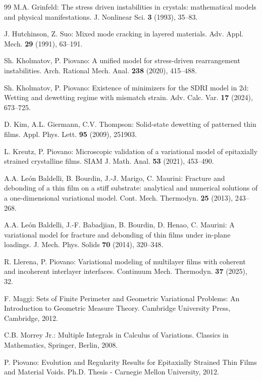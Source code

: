 \documentclass[reqno]{amsart}
\numberwithin{equation}{section}
\theoremstyle{plain}
\theoremstyle{definition}
\begin{document}
\begin{thebibliography}{99}
 M.A. Grinfeld:  The stress driven instabilities in crystals: mathematical models and physical manifestations.  J. Nonlinear Sci. \textbf{3} (1993), 35--83. 


 J. Hutchinson, Z. Suo:  Mixed mode cracking in layered materials.  Adv. Appl. Mech. {\bf 29} (1991), 63--191.

 Sh. Kholmatov, P. Piovano: A unified model for stress-driven rearrangement instabilities. Arch. Rational Mech. Anal. {\bf 238} (2020), 415--488. 


 Sh. Kholmatov, P. Piovano:  Existence of minimizers for the SDRI model in 2d: Wetting and dewetting regime with mismatch strain. Adv. Calc. Var. {\bf17} (2024), 673--725.

 D. Kim, A.L. Giermann,
C.V. Thompson: Solid-state dewetting of patterned thin films. Appl. Phys. Lett. {\bf 95} (2009), 251903.

 L. Kreutz,  P. Piovano: Microscopic validation of a variational model of epitaxially strained crystalline films. SIAM J. Math. Anal. \textbf{53} (2021), 453--490. 

  A.A. Le\'on Baldelli, B. Bourdin,  J.-J. Marigo, C. Maurini:  Fracture and debonding of a thin film on a stiff substrate: analytical and  numerical solutions of a one-dimensional variational model.  Cont. Mech. Thermodyn. \textbf{25} (2013), 243--268.

  A.A. Le\'on Baldelli, J.-F. Babadjian, B. Bourdin, D. Henao, C. Maurini: A variational model for fracture and debonding of thin  films under in-plane loadings. J. Mech. Phys. Solids \textbf{70} (2014), 320--348. 

 R. Llerena,  P. Piovano:
Variational modeling of multilayer films with coherent and incoherent interlayer interfaces. Continuum Mech. Thermodyn. {\bf 37} (2025), 32.



 F. Maggi: Sets of Finite Perimeter and Geometric Variational Problems: An Introduction to Geometric Measure Theory.  Cambridge University Press, Cambridge, 2012.

 C.B. Morrey Jr.: Multiple Integrals in Calculus of Variations. Classics in Mathematics, Springer, Berlin, 2008.

   P. Piovano: Evolution and Regularity Results for Epitaxially Strained Thin Films and Material Voids. Ph.D. Thesis - Carnegie Mellon University, 2012. 


\end{thebibliography}
\end{document}
